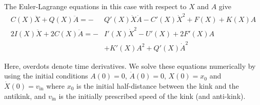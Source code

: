\documentclass[vecphys]{svmult}		%
\begin{document}
The Euler-Lagrange equations in this case with respect to $X$ and $A$
give
\begin{equation}\label{EL_ode} 
\begin{aligned}
C(X)\ddot{X}+Q(X)\ddot{A} = -&Q'(X)\dot{X}\dot{A}-C'(X)\dot{X}^2+F(X)+K(X)A\\
2I(X)\ddot{X}+2C(X)\ddot{A} = -&I'(X)\dot{X}^2-U'(X)+2F'(X)A\\
&+K'(X)A^2+Q'(X)\dot{A}^2
\end{aligned}
\end{equation}

Here, overdots denote
time derivatives. We solve these equations numerically by using the initial conditions $A(0)=0$, $\dot{A}(0)=0$, $X(0)=x_0$ and $\dot{X}(0)=v_{\mathrm{in}}$ where $x_0$ is the initial half-distance between the kink and the antikink, and $v_\mathrm{in}$ is the initially
prescribed speed of the kink (and anti-kink).
\end{document}
